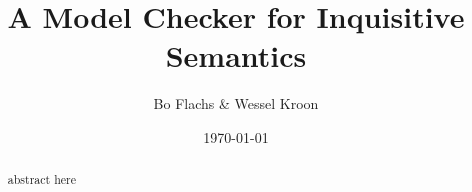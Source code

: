 \documentclass[12pt,a4paper]{article}
\title{A Model Checker for Inquisitive Semantics}
\author{Bo Flachs \& Wessel Kroon}
\date{\today}
\begin{document}
\maketitle

\begin{abstract}
abstract here
\end{abstract}

\tableofcontents

\clearpage

























\end{document}
